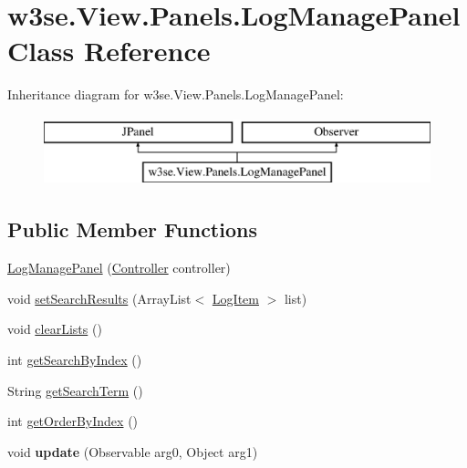 \hypertarget{classw3se_1_1_view_1_1_panels_1_1_log_manage_panel}{\section{w3se.\-View.\-Panels.\-Log\-Manage\-Panel Class Reference}
\label{classw3se_1_1_view_1_1_panels_1_1_log_manage_panel}
}
Inheritance diagram for w3se.\-View.\-Panels.\-Log\-Manage\-Panel\-:\begin{figure}[H]
\begin{center}
\leavevmode
\includegraphics[height=2.000000cm]{classw3se_1_1_view_1_1_panels_1_1_log_manage_panel}
\end{center}
\end{figure}
\subsection*{Public Member Functions}
\begin{DoxyCompactItemize}
\item 
\hyperlink{classw3se_1_1_view_1_1_panels_1_1_log_manage_panel_a6b50023fbe94b6fc1f4505b3000521a1}{Log\-Manage\-Panel} (\hyperlink{interfacew3se_1_1_controller_1_1_controller}{Controller} controller)
\item 
void \hyperlink{classw3se_1_1_view_1_1_panels_1_1_log_manage_panel_a84d2f6287742c0fa649cf3901d64a8d7}{set\-Search\-Results} (Array\-List$<$ \hyperlink{classw3se_1_1_model_1_1_base_1_1_log_item}{Log\-Item} $>$ list)
\item 
void \hyperlink{classw3se_1_1_view_1_1_panels_1_1_log_manage_panel_af6c5de223af5b8ab1cabd1114b8b40d3}{clear\-Lists} ()
\item 
int \hyperlink{classw3se_1_1_view_1_1_panels_1_1_log_manage_panel_acee3c048c767a263ef9695086be7f49a}{get\-Search\-By\-Index} ()
\item 
String \hyperlink{classw3se_1_1_view_1_1_panels_1_1_log_manage_panel_a4925796442c81880d96e8f8a1e25535b}{get\-Search\-Term} ()
\item 
int \hyperlink{classw3se_1_1_view_1_1_panels_1_1_log_manage_panel_a157c2f79a54011880130bb29a9d80daa}{get\-Order\-By\-Index} ()
\item 
\hypertarget{classw3se_1_1_view_1_1_panels_1_1_log_manage_panel_a6616863daa40e2b099c373de10f4aa35}{void {\bfseries update} (Observable arg0, Object arg1)}\label{classw3se_1_1_view_1_1_panels_1_1_log_manage_panel_a6616863daa40e2b099c373de10f4aa35}

\end{DoxyCompactItemize}



